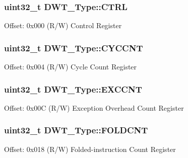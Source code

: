 \subsubsection[{\texorpdfstring{C\+T\+RL}{CTRL}}]{ uint32\+\_\+t D\+W\+T\+\_\+\+Type\+::\+C\+T\+RL}\hypertarget{struct_d_w_t___type_a37964d64a58551b69ce4c8097210d37d}{}\label{struct_d_w_t___type_a37964d64a58551b69ce4c8097210d37d}
Offset\+: 0x000 (R/W) Control Register 
\subsubsection[{\texorpdfstring{C\+Y\+C\+C\+NT}{CYCCNT}}]{ uint32\+\_\+t D\+W\+T\+\_\+\+Type\+::\+C\+Y\+C\+C\+NT}\hypertarget{struct_d_w_t___type_a71680298e85e96e57002f87e7ab78fd4}{}\label{struct_d_w_t___type_a71680298e85e96e57002f87e7ab78fd4}
Offset\+: 0x004 (R/W) Cycle Count Register 
\subsubsection[{\texorpdfstring{E\+X\+C\+C\+NT}{EXCCNT}}]{ uint32\+\_\+t D\+W\+T\+\_\+\+Type\+::\+E\+X\+C\+C\+NT}\hypertarget{struct_d_w_t___type_ac0801a2328f3431e4706fed91c828f82}{}\label{struct_d_w_t___type_ac0801a2328f3431e4706fed91c828f82}
Offset\+: 0x00C (R/W) Exception Overhead Count Register 
\subsubsection[{\texorpdfstring{F\+O\+L\+D\+C\+NT}{FOLDCNT}}]{ uint32\+\_\+t D\+W\+T\+\_\+\+Type\+::\+F\+O\+L\+D\+C\+NT}\hypertarget{struct_d_w_t___type_a35f2315f870a574e3e6958face6584ab}{}\label{struct_d_w_t___type_a35f2315f870a574e3e6958face6584ab}
Offset\+: 0x018 (R/W) Folded-\/instruction Count Register 
